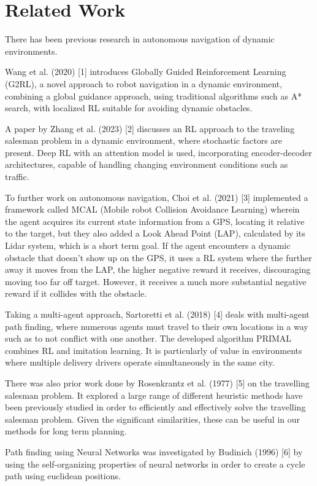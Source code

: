 \documentclass{article}
\begin{document}
	\section{Related Work}
	
	There has been previous research in autonomous navigation of dynamic environments. 
	
	Wang et al. (2020) [1] introduces Globally Guided Reinforcement Learning (G2RL), a novel approach to robot navigation in a dynamic environment, combining a global guidance approach, using traditional algorithms such as A* search, with localized RL suitable for avoiding dynamic obstacles.
	
	A paper by Zhang et al. (2023) [2] discusses an RL approach to the traveling salesman problem in a dynamic environment, where stochastic factors are present. Deep RL with an attention model is used, incorporating encoder-decoder architectures, capable of handling changing environment conditions such as traffic. 
	
	To further work on autonomous navigation, Choi et al. (2021) [3] implemented a framework called MCAL (Mobile robot Collision Avoidance Learning) wherein the agent acquires its current state information from a GPS, locating it relative to the target, but they also added a Look Ahead Point (LAP), calculated by its Lidar system, which is a short term goal. If the agent encounters a dynamic obstacle that doesn’t show up on the GPS, it uses a RL system where the further away it moves from the LAP, the higher negative reward it receives, discouraging moving too far off target. However, it receives a much more substantial negative reward if it collides with the obstacle.
    
	Taking a multi-agent approach, Sartoretti et al. (2018) [4] deals with multi-agent path finding, where numerous agents must travel to their own locations in a way such as to not conflict with one another. The developed algorithm PRIMAL combines RL and imitation learning. It is particularly of value in environments where multiple delivery drivers operate simultaneously in the same city.
	
	There was also prior work done by Rosenkrantz et al. (1977) [5] on the travelling salesman problem. It explored a large range of different heuristic methods have been previously studied in order to efficiently and effectively solve the travelling salesman problem. Given the significant similarities, these can be useful in our methods for long term planning.
	
	Path finding using Neural Networks was investigated by Budinich (1996) [6] by using the self-organizing properties of neural networks in order to create a cycle path using euclidean positions.
	
\end{document}
